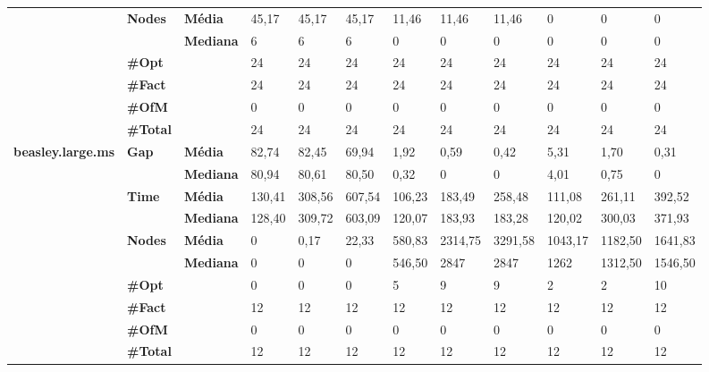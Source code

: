 \documentclass[]{article}
\begin{document}
\begin{table}[]
\begin{adjustbox}{angle=90}
\begin{tabular}{cll|lll|lll|lll}
				\cline{2-12}
				& \multirow{2}{*}{\textbf{Nodes}} & \textbf{Média} & 45,17 & 45,17 & 45,17 & 11,46 & 11,46 & 11,46 & 0 & 0 & 0 \\
				& & \textbf{Mediana} & 6 & 6 & 6 & 0 & 0 & 0 & 0 & 0 & 0 \\
				\cline{2-12}
				& \textbf{\#Opt} & & 24 & 24 & 24 & 24 & 24 & 24 & 24 & 24 & 24 \\
				& \textbf{\#Fact} & & 24 & 24 & 24 & 24 & 24 & 24 & 24 & 24 & 24 \\
				& \textbf{\#OfM} & & 0 & 0 & 0 & 0 & 0 & 0 & 0 & 0 & 0 \\
				& \textbf{\#Total} & & 24 & 24 & 24 & 24 & 24 & 24 & 24 & 24 & 24 \\
				\hline
				\multirow{7}{*}{\textbf{beasley.large.ms}} & \multirow{2}{*}{\textbf{Gap}} & \textbf{Média} & 82,74 & 82,45 & 69,94 & 1,92 & 0,59 & 0,42 & 5,31 & 1,70 & 0,31 \\
				& & \textbf{Mediana} & 80,94 & 80,61 & 80,50 & 0,32 & 0 & 0 & 4,01 & 0,75 & 0 \\
				\cline{2-12}
				& \multirow{2}{*}{\textbf{Time}} & \textbf{Média} & 130,41 & 308,56 & 607,54 & 106,23 & 183,49 & 258,48 & 111,08 & 261,11 & 392,52 \\
				& & \textbf{Mediana} & 128,40 & 309,72 & 603,09 & 120,07 & 183,93 & 183,28 & 120,02 & 300,03 & 371,93 \\
				\cline{2-12}
				& \multirow{2}{*}{\textbf{Nodes}} & \textbf{Média} & 0 & 0,17 & 22,33 & 580,83 & 2314,75 & 3291,58 & 1043,17 & 1182,50 & 1641,83 \\
				& & \textbf{Mediana} & 0 & 0 & 0 & 546,50 & 2847 & 2847 & 1262 & 1312,50 & 1546,50 \\
				\cline{2-12}
				& \textbf{\#Opt} & & 0 & 0 & 0 & 5 & 9 & 9 & 2 & 2 & 10 \\
				& \textbf{\#Fact} & & 12 & 12 & 12 & 12 & 12 & 12 & 12 & 12 & 12 \\
				& \textbf{\#OfM} & & 0 & 0 & 0 & 0 & 0 & 0 & 0 & 0 & 0 \\
				& \textbf{\#Total} & & 12 & 12 & 12 & 12 & 12 & 12 & 12 & 12 & 12 \\
			\end{tabular}
		\end{adjustbox}
	\end{table}
	
\end{document}
